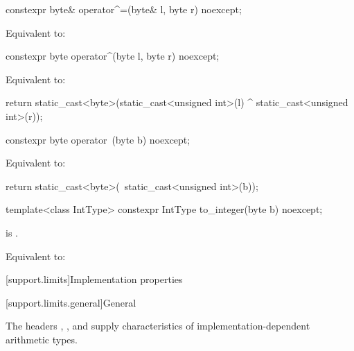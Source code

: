 %
\begin{itemdecl}
constexpr byte& operator^=(byte& l, byte r) noexcept;
\end{itemdecl}

\begin{itemdescr}
\pnum
\effects
Equivalent to: 
\end{itemdescr}

%
\begin{itemdecl}
constexpr byte operator^(byte l, byte r) noexcept;
\end{itemdecl}

\begin{itemdescr}
\pnum
\effects
Equivalent to:
\begin{codeblock}
return static_cast<byte>(static_cast<unsigned int>(l) ^ static_cast<unsigned int>(r));
\end{codeblock}
\end{itemdescr}

%
\begin{itemdecl}
constexpr byte operator~(byte b) noexcept;
\end{itemdecl}

\begin{itemdescr}
\pnum
\effects
Equivalent to:
\begin{codeblock}
return static_cast<byte>(~static_cast<unsigned int>(b));
\end{codeblock}
\end{itemdescr}

%
\begin{itemdecl}
template<class IntType>
  constexpr IntType to_integer(byte b) noexcept;
\end{itemdecl}

\begin{itemdescr}
\pnum
\constraints
{} is .

\pnum
\effects
Equivalent to: 
\end{itemdescr}

[support.limits]{Implementation properties}

[support.limits.general]{General}

\pnum
The headers
,
, and
supply characteristics of
%
imple\-mentation-dependent
arithmetic types.

